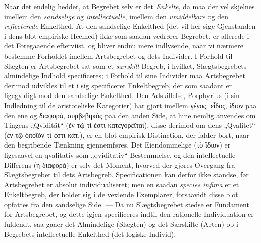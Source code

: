 \documentclass[12pt]{book}
\newcommand{\opage}[1]{\marginnote{\footnotesize\textit{[#1]}}}
\begin{document}
Naar det endelig hedder, at Begrebet selv er det \emph{Enkelte}, da maa der vel
skjelnes imellem den \emph{sandselige} og \emph{intellectuelle}, imellem den
\emph{umiddelbare} og den \emph{reflecterede} Enkelthed. At den sandselige
Enkelthed (det vil her sige Gjenstanden i dens blot empiriske Heelhed) ikke som
saadan vedrører Begrebet, er allerede i det Foregaaende efterviist, og bliver
endnu mere indlysende, naar vi nærmere bestemme Forholdet imellem Artsbegrebet
og dets Individer. I Forhold til Slægten er Artsbegrebet sat som et
\emph{særskilt} Begreb, i hvilket, Slægtsbegrebets almindelige Indhold
specificeres; i Forhold til sine Individer maa Artsbegrebet derimod
\opage{32} udvikles til et i sig specificeret Enkeltbegreb, der som saadant er ligegyldigt
mod den sandselige Enkelthed. Den Adskillelse, Porphyrius (i sin Indledning til
de aristoteliske Kategorier) har gjort imellem γένος, εἶδος, ἰδιον paa den ene
og διαφορὰ, συμβεβηκὸς paa den anden Side, at hine nemlig anvendes om Tingens
„Qvidität“ (ἐν τῷ τί ἐστι κατεγορεῖται), disse derimod om dens „Qvalitet“
(ἐν τῷ ὁποῖόν τί ἐστι κατ.), er en blot empirisk Distinction, der falder bort,
naar den begribende Tænkning gjennemføres. Det Eiendommelige (τὸ ἴδιον) er
ligesaavel en qvalitativ som „qviditativ“ Bestemmelse, og den intellectuelle
Differens (ἡ διαφορὰ) er selv det Moment, hvorved der gjøres Overgang fra
Slægtsbegrebet til dets Artsbegreb. Specificationen kan derfor ikke standse, før
Artsbegrebet er absolut individualiseret; men en saadan \textit{species infima}
er et Enkeltbegreb, der holder sig i de vexlende Exemplarer, forsaavidt disse
blot opfattes fra den sandselige Side. --- Da nu Slægtsbegrebet stedse er
Fundament for Artsbegrebet, og dette igjen specificeres indtil den rationelle
Individuation er fuldendt, saa gaaer det Almindelige (Slægten) og det Særskilte
(Arten) op i Begrebets intellectuelle Enkelthed (det logiske Individ).
\end{document}
